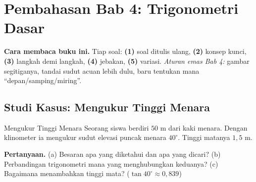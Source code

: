
\renewcommand{\babjudul}{Pembahasan Latihan — Bab 4}


\setcounter{chapter}{4}

\chapter*{Pembahasan Bab 4: Trigonometri Dasar}

\begin{tips}
\textbf{Cara membaca buku ini.} Tiap soal: \textbf{(1)} soal ditulis ulang,
\textbf{(2)} konsep kunci, \textbf{(3)} langkah demi langkah, \textbf{(4)}
jebakan, \textbf{(5)} variasi. \emph{Aturan emas Bab 4:} gambar segitiganya,
tandai sudut acuan lebih dulu, baru tentukan mana ``depan/samping/miring''.
\end{tips}

\section*{Studi Kasus: Mengukur Tinggi Menara}

\begin{studikasus}{Mengukur Tinggi Menara}
Seorang siswa berdiri $50$ m dari kaki menara. Dengan klinometer ia mengukur
sudut elevasi puncak menara $40^\circ$. Tinggi matanya $1{,}5$ m.
\begin{center}
\end{center}
\textbf{Pertanyaan.} (a) Besaran apa yang diketahui dan apa yang dicari?
(b) Perbandingan trigonometri mana yang menghubungkan keduanya?
(c) Bagaimana menambahkan tinggi mata? ($\tan40^\circ\approx0{,}839$)
\end{studikasus}

